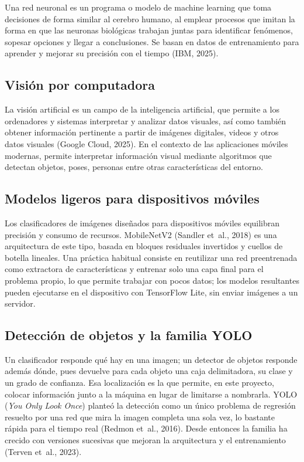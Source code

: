 Una red neuronal es un programa o modelo de machine learning que toma
decisiones de forma similar al cerebro humano, al emplear procesos que imitan
la forma en que las neuronas biológicas trabajan juntas para identificar
fenómenos, sopesar opciones y llegar a conclusiones. Se basan en datos de
entrenamiento para aprender y mejorar su precisión con el tiempo (IBM, 2025).

\subsection{Visión por computadora}

La visión artificial es un campo de la inteligencia artificial, que permite a
los ordenadores y sistemas interpretar y analizar datos visuales, así como
también obtener información pertinente a partir de imágenes digitales, videos
y otros datos visuales (Google Cloud, 2025). En el contexto de las aplicaciones
móviles modernas, permite interpretar información visual mediante algoritmos
que detectan objetos, poses, personas entre otras características del entorno.

\subsection{Modelos ligeros para dispositivos móviles}

Los clasificadores de imágenes diseñados para dispositivos móviles equilibran
precisión y consumo de recursos. MobileNetV2 (Sandler et~al., 2018) es una
arquitectura de este tipo, basada en bloques residuales invertidos y cuellos de
botella lineales. Una práctica habitual consiste en reutilizar una red
preentrenada como extractora de características y entrenar solo una capa final
para el problema propio, lo que permite trabajar con pocos datos; los modelos
resultantes pueden ejecutarse en el dispositivo con TensorFlow Lite, sin enviar
imágenes a un servidor.

\subsection{Detección de objetos y la familia YOLO}
\label{subsec:yolo}

Un clasificador responde qué hay en una imagen; un detector de objetos
responde además dónde, pues devuelve para cada objeto una caja delimitadora,
su clase y un grado de confianza. Esa localización es la que permite, en este
proyecto, colocar información junto a la máquina en lugar de limitarse a
nombrarla. YOLO (\emph{You Only Look Once}) planteó la detección como un único
problema de regresión resuelto por una red que mira la imagen completa una sola
vez, lo bastante rápida para el tiempo real (Redmon et~al., 2016). Desde
entonces la familia ha crecido con versiones sucesivas que mejoran la
arquitectura y el entrenamiento (Terven et~al., 2023).

